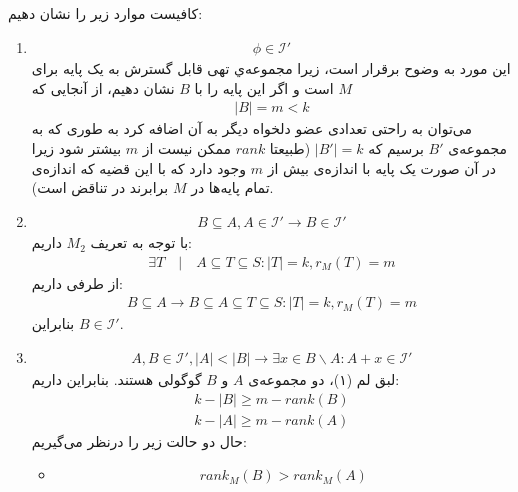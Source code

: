 \documentclass[a4paper,12pt]{article}
\begin{document}
 
\proof{}
کافیست موارد زیر را نشان دهیم:
\begin{enumerate}
	\item 
\begin{align*}
	\phi \in \mathcal{I'}
\end{align*}
	این مورد به وضوح برقرار است، زیرا مجموعه‌ي تهی قابل گسترش به یک پایه برای $M$ است و اگر این پایه را با $B$ نشان دهیم، از آنجایی که
\begin{align*}
	|B| = m < k
\end{align*}
می‌توان به راحتی تعدادی عضو دلخواه دیگر به آن اضافه کرد به طوری که به مجموعه‌ی $B'$ برسیم که $|B'| = k$ (طبیعتا $rank$ ممکن نیست از $m$ بیشتر شود زیرا در آن صورت یک پایه‌ با اندازه‌ی بیش از $m$ وجود دارد که با این قضیه که اندازه‌ی تمام پایه‌ها در $M$ برابرند در تناقض است).
\item
\begin{align*}
	B \subseteq A, A \in \mathcal{I'} \rightarrow B \in \mathcal{I'}
\end{align*}
با توجه به تعریف $M_2$ داریم:
\begin{align*}
\exists T \quad | \quad A \subseteq T \subseteq S : |T| = k , r_M(T) = m
\end{align*}
از طرفی داریم:
\begin{align*}
	B \subseteq A \rightarrow B \subseteq A \subseteq T \subseteq S : |T| = k , r_M(T) = m
\end{align*}
بنابراین $B \in \mathcal{I'}$.
\item 
\begin{align*}
A,B \in \mathcal{I'} , |A| < |B| \rightarrow \exists x \in B \backslash A : A + x \in \mathcal{I'}
\end{align*}
لبق لم (۱)، دو مجموعه‌ی $A$ و $B$ گوگولی هستند. بنابراین داریم:
\begin{align*}
	k - |B| \geq m - rank(B) \\
	k - |A| \geq m - rank(A)
\end{align*}
حال دو حالت زیر را درنظر می‌گیریم:
\begin{itemize}
	\item 
	\begin{align*}
		rank_M(B) > rank_M(A)
	\end{align*}

\end{itemize}
\end{enumerate}
\end{document}
